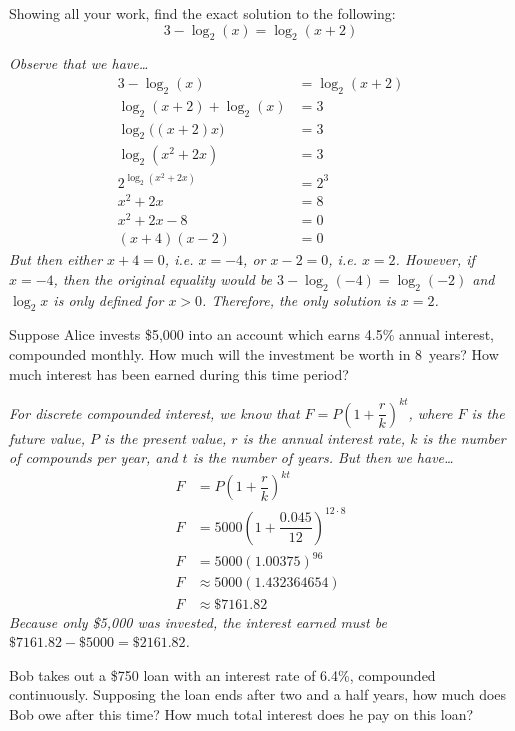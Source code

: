 \documentclass[12pt,letterpaper]{exam}
\begin{document}
\begin{questions}
\newpage
\question[10] Showing all your work, find the exact solution to the following: 
	\[
	3 - \log_2(x)= \log_2(x + 2)
	\] \pvspace{1.5cm}
	
{\itshape Observe that we have\dots
	\[
	\begin{aligned}
	3 - \log_2(x)&= \log_2(x + 2) \\[0.5cm]
	\log_2(x + 2) + \log_2(x)&= 3 \\[0.5cm]
	\log_2\big( (x + 2)x \big)&= 3 \\[0.5cm]
	\log_2(x^2 + 2x)&= 3 \\[0.5cm]
	2^{\log_2(x^2 + 2x)}&= 2^3 \\[0.5cm] 
	x^2 + 2x&= 8 \\[0.5cm]
	x^2 + 2x - 8&= 0 \\[0.5cm]
	(x + 4)(x - 2)&= 0
	\end{aligned}
	\] \pspace
But then either $x + 4= 0$, i.e. $x= -4$, or $x - 2= 0$, i.e. $x= 2$. However, if $x= -4$, then the original equality would be $3 - \log_2(-4)= \log_2(-2)$ and $\log_2 x$ is only defined for $x > 0$. Therefore, the only solution is $x= 2$.}



\newpage
\question[10] Suppose Alice invests \$5,000 into an account which earns 4.5\% annual interest, compounded monthly. How much will the investment be worth in 8~years? How much interest has been earned during this time period? \pvspace{1.5cm}

{\itshape For discrete compounded interest, we know that $F= P \left(1 + \dfrac{r}{k} \right)^{kt}$, where $F$ is the future value, $P$ is the present value, $r$ is the annual interest rate, $k$ is the number of compounds per year, and $t$ is the number of years. But then we have\dots \pspace
	\[
	\begin{aligned}
	F&= P \left(1 + \dfrac{r}{k} \right)^{kt} \\[0.5cm]
	F&= 5000 \left(1 + \dfrac{0.045}{12} \right)^{12 \cdot 8} \\[0.5cm]
	F&= 5000 (1.00375)^{96} \\[0.5cm]
	F&\approx 5000(1.432364654) \\[0.5cm]
	F&\approx \$7161.82
	\end{aligned}
	\] \pspace
Because only \$5,000 was invested, the interest earned must be $\$7161.82 - \$5000= \$2161.82$. 
}



\newpage
\question[10] Bob takes out a \$750 loan with an interest rate of 6.4\%, compounded continuously. Supposing the loan ends after two and a half years, how much does Bob owe after this time? How much total interest does he pay on this loan? \pvspace{1.5cm}


\end{questions}
\end{document}
